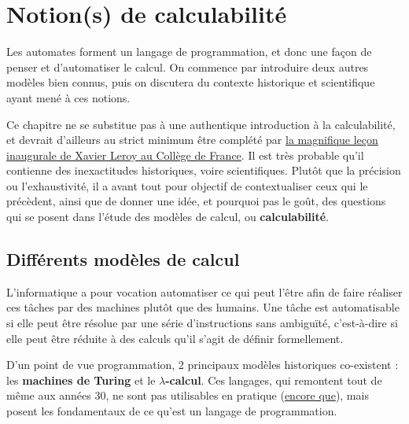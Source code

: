 
\chapter{Notion(s) de calculabilité}

Les automates forment un langage de programmation, et donc une façon de penser et d'automatiser le calcul. On commence par introduire deux autres modèles bien connus, puis on discutera du contexte historique et scientifique ayant mené à ces notions.

Ce chapitre ne se substitue pas à une authentique introduction à la calculabilité, et devrait d'ailleurs au strict minimum être complété par \href{https://www.college-de-france.fr/site/xavier-leroy/inaugural-lecture-2018-11-15-18h00.htm}{la magnifique leçon inaugurale de Xavier Leroy au Collège de France}. Il est très probable qu'il contienne des inexactitudes historiques, voire scientifiques. Plutôt que la précision ou l'exhaustivité, il a avant tout pour objectif de contextualiser ceux qui le précèdent, ainsi que de donner une idée, et pourquoi pas le goût, des questions qui se posent dans l'étude des modèles de calcul, ou \textbf{calculabilité}.

\section{Différents modèles de calcul}

L'informatique a pour vocation automatiser ce qui peut l'être afin de faire réaliser ces tâches par des machines plutôt que des humains. Une tâche est automatisable si elle peut être résolue par une série d'instructions sans ambiguïté, c'est-à-dire si elle peut être réduite à des calculs qu'il s'agit de définir formellement. 

D'un point de vue programmation, 2 principaux modèles historiques co-existent : les \textbf{machines de Turing} et le \textbf{$\lambda$-calcul}. Ces langages, qui remontent tout de même aux années 30, ne sont pas utilisables en pratique (\href{http://www.ens-lyon.fr/actualite/lecole/la-machine-de-turing-en-legos}{encore que}), mais posent les fondamentaux de ce qu'est un langage de programmation.

